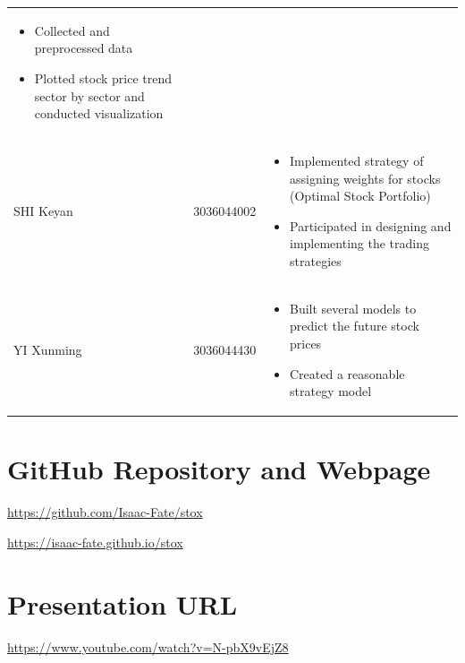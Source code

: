 \documentclass[a4paper, 11pt]{my-elegantpaper}
\begin{document}
\begin{table}[H]
\begin{tabular}{l l p{10cm}}
\begin{itemize}
            \item Collected and preprocessed data 
            \item Plotted stock price trend sector by sector and conducted visualization
        \end{itemize} \\ 
        SHI Keyan
        & 3036044002
        & \begin{itemize}
            \item Implemented strategy of assigning weights for stocks (Optimal Stock Portfolio)
            \item Participated in designing and implementing the trading strategies
        \end{itemize} \\
        YI Xunming
        & 3036044430
        & \begin{itemize}
            \item Built several models to predict the future stock prices
            \item Created a reasonable strategy model
        \end{itemize} \\ 
        \bottomrule
    \end{tabular}
\end{table}


\section{GitHub Repository and Webpage}

\url{https://github.com/Isaac-Fate/stox}

\url{https://isaac-fate.github.io/stox}


\section{Presentation URL}

\url{https://www.youtube.com/watch?v=N-pbX9vEjZ8}

\end{document}
